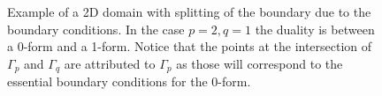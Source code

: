 \documentclass{elsarticle}
\begin{document}
\begin{figure}[tbh]
	\hspace{8pt}%
\caption{Example of a 2D domain with splitting of the boundary due to the boundary conditions. In the case $p=2, q=1$ the duality is between a 0-form  and a 1-form. Notice that the points at the intersection of $\Gamma_p$ and $\Gamma_q$ are attributed to $\Gamma_p$ as those will correspond to the essential boundary conditions for the 0-form.}%
\label{fig:notation_dofs}%
\end{figure}
 
\end{document}
